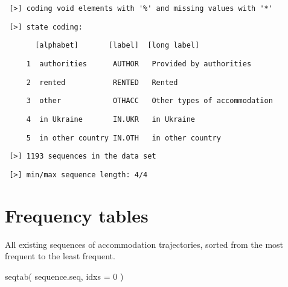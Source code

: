 \documentclass[
  letterpaper,
  DIV=11,
  numbers=noendperiod]{scrreprt}
\newenvironment{Shaded}{\begin{snugshade}}{\end{snugshade}}
\newcommand{\AttributeTok}[1]{\textcolor[rgb]{0.40,0.45,0.13}{#1}}
\newcommand{\DecValTok}[1]{\textcolor[rgb]{0.68,0.00,0.00}{#1}}
\newcommand{\FunctionTok}[1]{\textcolor[rgb]{0.28,0.35,0.67}{#1}}
\newcommand{\NormalTok}[1]{\textcolor[rgb]{0.00,0.23,0.31}{#1}}
\begin{document}
\begin{verbatim}
 [>] coding void elements with '%' and missing values with '*'
\end{verbatim}

\begin{verbatim}
 [>] state coding:
\end{verbatim}

\begin{verbatim}
       [alphabet]       [label]  [long label] 
\end{verbatim}

\begin{verbatim}
     1  authorities      AUTHOR   Provided by authorities
\end{verbatim}

\begin{verbatim}
     2  rented           RENTED   Rented
\end{verbatim}

\begin{verbatim}
     3  other            OTHACC   Other types of accommodation
\end{verbatim}

\begin{verbatim}
     4  in Ukraine       IN.UKR   in Ukraine
\end{verbatim}

\begin{verbatim}
     5  in other country IN.OTH   in other country
\end{verbatim}

\begin{verbatim}
 [>] 1193 sequences in the data set
\end{verbatim}

\begin{verbatim}
 [>] min/max sequence length: 4/4
\end{verbatim}

\section{Frequency tables}\label{frequency-tables}

All existing sequences of accommodation trajectories, sorted from the
most frequent to the least frequent.

\begin{Shaded}
\begin{Highlighting}[]
\FunctionTok{seqtab}\NormalTok{(}
\NormalTok{  sequence.seq, }\AttributeTok{idxs =} \DecValTok{0}
\NormalTok{)}
\end{Highlighting}
\end{Shaded}
\end{document}
